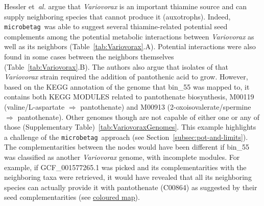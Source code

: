 \documentclass[sn-mathphys,Numbered]{sn-jnl}  %
\theoremstyle{thmstyleone}%
\theoremstyle{thmstyletwo}%
\theoremstyle{thmstylethree}%
\newcommand{\microbetag}{\texttt{microbetag}}
\begin{document}
        Hessler et~\textit{al.} argue that \textit{Variovorax} is an important thiamine source and can supply neighboring species that cannot produce it (auxotrophs). 
        Indeed, \microbetag~\space was able to suggest several thiamine-related potential seed complements among the potential metabolic interactions between \textit{Variovorax} as well as its neighbors (Table~\ref{tab:Variovorax}.A). 
        Potential interactions were also found in some cases between the neighbors themselves (Table~\ref{tab:Variovorax}.B).
        The authors also argue that isolates of that \textit{Variovorax} strain required the addition of pantothenic acid to grow. 
        However, based on the KEGG annotation of the genome that bin\_55 was mapped to, it contains both KEGG MODULES related to pantothenate biosynthesis,  
        M00119 (valine/L-aspartate $\Rightarrow$ pantothenate) and 
        M00913 (2-oxoisovalerate/spermine $\Rightarrow$ pantothenate).
        Other genomes though are not capable of either one or any of those (Supplementary Table)~\ref{tab:VariovoraxGenomes}.
        This example highlights a challenge of the \microbetag~\space approach (see Section~\ref{subsec:pot-and-limits}). 
        The complementarities between the nodes would have been different if bin\_55 was classified as another \textit{Variovorax} genome, with incomplete modules. 
        For example, if GCF\_001577265.1 was picked and its complementarities with the neighboring taxa were retrieved, it would have revealed that all its neighboring species can actually provide it with pantothenate (C00864) as suggested by their seed complementarities (see
        \href{https://www.kegg.jp/kegg-bin/show_pathway?map00770/C00049%20skyblue%2Cblue/C00099%20skyblue%2Cblue/C00141%20skyblue%2Cblue/C00966%20skyblue%2Cblue/C00010%20skyblue%2Cblue/C00882%20skyblue%2Cblue/C01134%20skyblue%2Cblue/C03492%20skyblue%2Cblue/C04352%20skyblue%2Cblue/C00099%20skyblue%2Cblue/C00141%20skyblue%2Cblue/C00966%20skyblue%2Cblue/C05665%20skyblue%2Cblue/C00010%20skyblue%2Cblue/C00141%20skyblue%2Cblue/C00882%20skyblue%2Cblue/C00966%20skyblue%2Cblue/C01134%20skyblue%2Cblue/C03492%20skyblue%2Cblue/C04352%20skyblue%2Cblue/C18911%20skyblue%2Cblue/C00864%09%23ff0000/C00864%09%23ff0000/C00864%09%23ff0000/}{coloured map}). 


\end{document}
